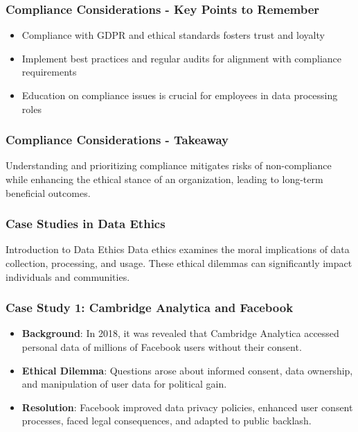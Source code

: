 \documentclass[aspectratio=169]{beamer}
\begin{document}
\begin{frame}[fragile]
    \frametitle{Compliance Considerations - Key Points to Remember}
    \begin{itemize}
        \item Compliance with GDPR and ethical standards fosters trust and loyalty
        \item Implement best practices and regular audits for alignment with compliance requirements
        \item Education on compliance issues is crucial for employees in data processing roles
    \end{itemize}
\end{frame}

\begin{frame}[fragile]
    \frametitle{Compliance Considerations - Takeaway}
    Understanding and prioritizing compliance mitigates risks of non-compliance while enhancing the ethical stance of an organization, leading to long-term beneficial outcomes.
\end{frame}

\begin{frame}[fragile]
    \frametitle{Case Studies in Data Ethics}
    \begin{block}{Introduction to Data Ethics}
        Data ethics examines the moral implications of data collection, processing, and usage. These ethical dilemmas can significantly impact individuals and communities.
    \end{block}
\end{frame}

\begin{frame}[fragile]
    \frametitle{Case Study 1: Cambridge Analytica and Facebook}
    \begin{itemize}
        \item \textbf{Background}: In 2018, it was revealed that Cambridge Analytica accessed personal data of millions of Facebook users without their consent.
        \item \textbf{Ethical Dilemma}: Questions arose about informed consent, data ownership, and manipulation of user data for political gain.
        \item \textbf{Resolution}: Facebook improved data privacy policies, enhanced user consent processes, faced legal consequences, and adapted to public backlash.
    \end{itemize}
\end{frame}
\end{document}
